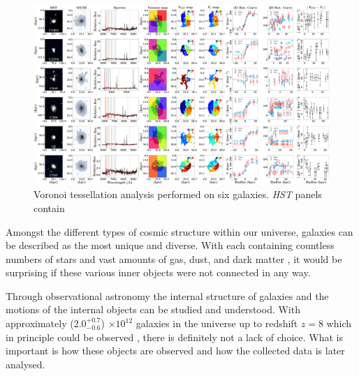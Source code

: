 \documentclass[12pt, twocolumn]{revtex4-1}    %
\begin{document}
\begin{figure}
\centering
\includegraphics[width=1.0\textheight,height=0.6\textwidth]{data/spectra_complete_velocities}
\vspace{1cm}  %
\captionsetup{justification=raggedright}
\caption[Tully-Fisher]{Voronoi tessellation analysis performed on six galaxies. \textit{HST} panels contain  }
\label{fig:multiple_spectra}
\end{figure}

\twocolumngrid


Amongst the different types of cosmic structure within our universe, galaxies can be described as the most unique and diverse. With each containing countless numbers of stars and vast amounts of gas, dust, and dark matter \citep{carroll_astro}, it would be surprising if these various inner objects were not connected in any way.

Through observational astronomy the internal structure of galaxies and the motions of the internal objects can be studied and understood. With approximately ($2.0^{+0.7}_{-0.6}$) $\times 10^{12}$ galaxies in the universe up to redshift $z=8$ which in principle could be observed \citep{conselice_galaxynumber}, there is definitely not a lack of choice. What is important is how these objects are observed and how the collected data is later analysed. 



\end{document}
